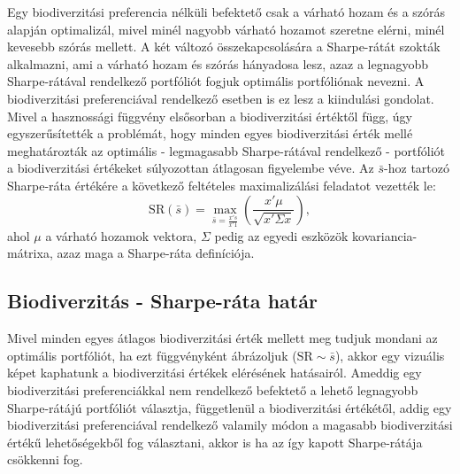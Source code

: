 Egy biodiverzitási preferencia nélküli befektető csak a várható hozam és a szórás alapján optimalizál, mivel minél nagyobb várható hozamot szeretne elérni, minél kevesebb szórás mellett. A két változó összekapcsolására a Sharpe-rátát szokták alkalmazni, ami a várható hozam és szórás hányadosa lesz, azaz a legnagyobb Sharpe-rátával rendelkező portfóliót fogjuk optimális portfóliónak nevezni. A biodiverzitási preferenciával rendelkező esetben is ez lesz a kiindulási gondolat. Mivel a hasznossági függvény elsősorban a biodiverzitási értéktől függ, \textcite{pedersen_responsible_2021} úgy egyszerűsítették a problémát, hogy minden egyes biodiverzitási érték mellé meghatározták az optimális - legmagasabb Sharpe-rátával rendelkező - portfóliót a biodiverzitási értékeket súlyozottan átlagosan figyelembe véve. Az $\bar{s}$-hoz tartozó Sharpe-ráta értékére a következő feltételes maximalizálási feladatot vezették le:
\begin{equation}
    \text{SR}(\bar{s}) = \max_{\bar{s}=\frac{x's}{x'1}} \left( \frac{x'\mu}{\sqrt{x'\Sigma x}} \right) ,
\end{equation}
ahol $\mu$ a várható hozamok vektora, $\Sigma$ pedig az egyedi eszközök kovariancia-mátrixa, azaz maga a Sharpe-ráta definíciója.

\subsection{Biodiverzitás - Sharpe-ráta határ}

Mivel minden egyes átlagos biodiverzitási érték mellett meg tudjuk mondani az optimális portfóliót, ha ezt függvényként ábrázoljuk ($\text{SR} \sim \bar{s}$), akkor egy vizuális képet kaphatunk a biodiverzitási értékek elérésének hatásairól. Ameddig egy biodiverzitási preferenciákkal nem rendelkező befektető a lehető legnagyobb Sharpe-rátájú portfóliót választja, függetlenül a biodiverzitási értékétől, addig egy biodiverzitási preferenciával rendelkező valamily módon a magasabb biodiverzitási értékű lehetőségekből fog választani, akkor is ha az így kapott Sharpe-rátája csökkenni fog.
